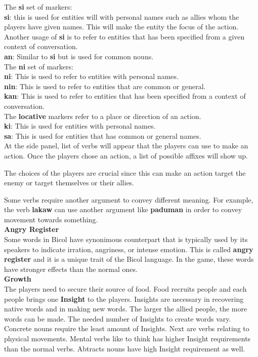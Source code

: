 \documentclass[11pt]{article}
\begin{document}
The \textbf{si} set of markers:\\
\textbf{si}: this is used for entities will with personal names such as allies whom the players have given names. This will make the entity the focus of the action. Another usage of \textbf{si} is to refer to entities that has been specified from a given context of conversation. \\
\textbf{an}: Similar to \textbf{si} but is used for common nouns.\\

The \textbf{ni} set of markers:\\
\textbf{ni}: This is used to refer to entities with personal names.\\
\textbf{nin}: This is used to refer to entities that are common or general.\\
\textbf{kan}: This is used to refer to entities that has been specified from a context of conversation.\\

The \textbf{locative} markers refer to a place or direction of an action.\\
\textbf{ki}: This is used for entities with personal names.\\
\textbf{sa}: This is used for entities that has common or general names.\\

At the side panel, list of verbs will appear that the players can use to make an action. Once the players chose an action, a list of possible affixes will show up.

The choices of the players are crucial since this can make an action target the enemy or target themselves or their allies.

Some verbs require another argument to convey different meaning. For example, the verb \textbf{lakaw} can use another argument like \textbf{paduman} in order to convey movement towards something.\\

\textbf{Angry Register}\\
Some words in Bicol have synonimous counterpart that is typically used by its speakers to indicate irration, angriness, or intense emotion. This is called \textbf{angry register} and it is a unique trait of the Bicol language. In the game, these words have stronger effects than the normal ones.\\

\textbf{Growth}\\
The players need to secure their source of food. Food recruits people and each people brings one \textbf{Insight} to the players. Insights are necessary in recovering native words and in making new words. The larger the allied people, the more words can be made. The needed number of Insights to create words vary.
Concrete nouns require the least amount of Insights. Next are verbs relating to physical movements. Mental verbs like to think has higher Insight requirements than the normal verbs. Abtracts nouns have high Insight requirement as well.
\end{document}
